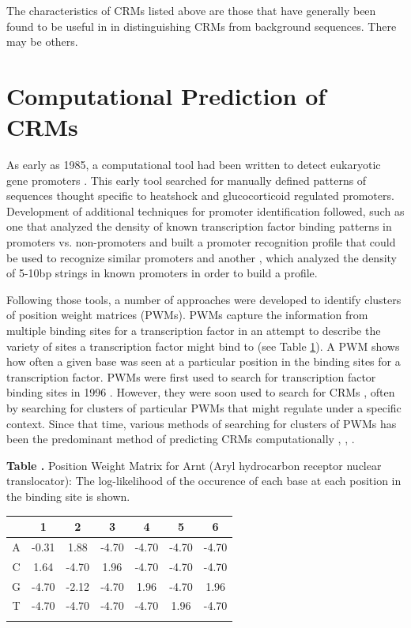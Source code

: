\documentclass{frontiersENG} %
\begin{document}
The characteristics of CRMs listed above are those that have generally
been found to be useful in in distinguishing CRMs from background
sequences. There may be others. 

\section{Computational Prediction of CRMs}
\label{section:compprediction}
As early as 1985, a computational tool had been written to detect
eukaryotic gene promoters \cite{Claverie1985}. This early tool
searched for manually defined patterns of sequences thought specific
to heatshock and glucocorticoid regulated promoters. Development of
additional techniques for promoter identification followed, such as
one that analyzed the density of known transcription factor binding
patterns in promoters vs. non-promoters and built a promoter
recognition profile \cite{Prestridge1995} that could be used to
recognize similar promoters and another \cite{Chen1997}, which
analyzed the density of 5-10bp strings in known promoters in order to
build a profile.

Following those tools, a number of approaches were developed to
identify clusters of position weight matrices (PWMs). PWMs capture the
information from multiple binding sites for a transcription factor in
an attempt to describe the variety of sites a transcription factor
might bind to (see Table \ref{table:arntPWM}). A PWM shows how often a
given base was seen at a particular position in the binding
sites for a transcription factor. PWMs were first used to search for
transcription factor binding sites in 1996
\cite{Fickett1996}. However, they were soon used to search for CRMs
\cite{Wasserman1998}, often by searching for clusters of particular
PWMs that might regulate under a specific context. Since that time,
various methods of searching for clusters of PWMs has been the
predominant method of predicting CRMs computationally \cite{Elnitski2006},
\cite{Loo2009}, \cite{Su2010}.

\begin{table}[!t]
\textbf{\label{table:arntPWM} Table .}{ Position Weight Matrix for Arnt (Aryl hydrocarbon receptor nuclear translocator): The log-likelihood of the occurence of each base at each position in the binding site is shown. }

\processtable{ }
{\begin{tabular}{ccccccc}\toprule
 & \textbf{1} & \textbf{2} & \textbf{3} & \textbf{4}  & \textbf{5} & \textbf{6}\\
\midrule
A & -0.31 & 1.88 & -4.70 & -4.70 & -4.70 & -4.70 \\
C & 1.64 & -4.70 & 1.96 & -4.70 & -4.70 & -4.70 \\
G & -4.70 & -2.12 & -4.70 & 1.96 & -4.70 & 1.96 \\
T & -4.70 & -4.70 & -4.70 & -4.70 & 1.96 & -4.70 \\
\botrule

\end{tabular}}{}
\end{table}
\end{document}
